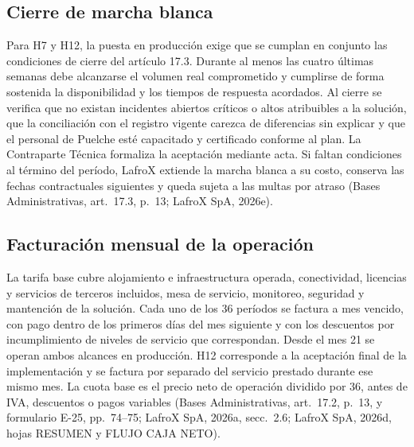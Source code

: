 \subsection{Cierre de marcha blanca}
Para H7 y H12, la puesta en producción exige que se cumplan en conjunto las condiciones de cierre del artículo 17.3. Durante al menos las cuatro últimas semanas debe alcanzarse el volumen real comprometido y cumplirse de forma sostenida la disponibilidad y los tiempos de respuesta acordados. Al cierre se verifica que no existan incidentes abiertos críticos o altos atribuibles a la solución, que la conciliación con el registro vigente carezca de diferencias sin explicar y que el personal de Puelche esté capacitado y certificado conforme al plan. La Contraparte Técnica formaliza la aceptación mediante acta. Si faltan condiciones al término del período, LafroX extiende la marcha blanca a su costo, conserva las fechas contractuales siguientes y queda sujeta a las multas por atraso (Bases Administrativas, art.~17.3, p.~13; LafroX SpA, 2026e).

\subsection{Facturación mensual de la operación}
La tarifa base cubre alojamiento e infraestructura operada, conectividad, licencias y servicios de terceros incluidos, mesa de servicio, monitoreo, seguridad y mantención de la solución. Cada uno de los 36 períodos se factura a mes vencido, con pago dentro de los primeros días del mes siguiente y con los descuentos por incumplimiento de niveles de servicio que correspondan. Desde el mes 21 se operan ambos alcances en producción. H12 corresponde a la aceptación final de la implementación y se factura por separado del servicio prestado durante ese mismo mes. La cuota base es el precio neto de operación dividido por 36, antes de IVA, descuentos o pagos variables (Bases Administrativas, art.~17.2, p.~13, y formulario E-25, pp.~74--75; LafroX SpA, 2026a, secc.~2.6; LafroX SpA, 2026d, hojas RESUMEN y FLUJO CAJA NETO).

